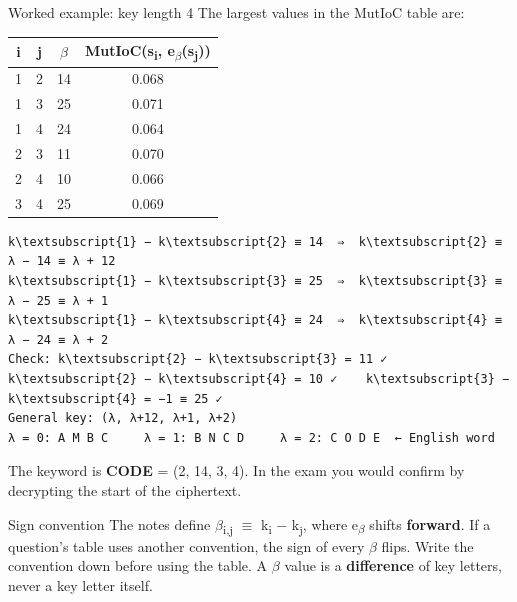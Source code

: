 \documentclass[11pt,a4paper]{article}
\begin{document}
\begin{example}{Worked example: key length 4}
The largest values in the MutIoC table are:\par
\begin{center}\begin{tabular}{|c|c|c|c|}\hline
\rowcolor{navy!10}\textbf{i} & \textbf{j} & \textbf{\ensuremath{\beta}} & \textbf{MutIoC(s\textsubscript{i}, e\textsubscript{\ensuremath{\beta}}(s\textsubscript{j}))} \\ \hline
1 & 2 & 14 & 0.068 \\ \hline
1 & 3 & 25 & 0.071 \\ \hline
1 & 4 & 24 & 0.064 \\ \hline
2 & 3 & 11 & 0.070 \\ \hline
2 & 4 & 10 & 0.066 \\ \hline
3 & 4 & 25 & 0.069 \\ \hline
\end{tabular}\end{center}
\begin{workbox}
\begin{Verbatim}[commandchars=\\\{\},fontsize=\footnotesize]
k\textsubscript{1} − k\textsubscript{2} ≡ 14  ⇒  k\textsubscript{2} ≡ λ − 14 ≡ λ + 12
k\textsubscript{1} − k\textsubscript{3} ≡ 25  ⇒  k\textsubscript{3} ≡ λ − 25 ≡ λ + 1
k\textsubscript{1} − k\textsubscript{4} ≡ 24  ⇒  k\textsubscript{4} ≡ λ − 24 ≡ λ + 2
Check: k\textsubscript{2} − k\textsubscript{3} = 11 ✓    k\textsubscript{2} − k\textsubscript{4} = 10 ✓    k\textsubscript{3} − k\textsubscript{4} = −1 ≡ 25 ✓
General key: (λ, λ+12, λ+1, λ+2)
λ = 0: A M B C     λ = 1: B N C D     λ = 2: C O D E  ← English word
\end{Verbatim}
\end{workbox}
The keyword is \textbf{CODE} = (2, 14, 3, 4). In the exam you would confirm by decrypting the start of the ciphertext.\par
\end{example}
\begin{trap}{Sign convention}
The notes define \ensuremath{\beta}\textsubscript{i,j} \ensuremath{\equiv} k\textsubscript{i} \ensuremath{-} k\textsubscript{j}, where e\textsubscript{\ensuremath{\beta}} shifts \textbf{forward}. If a question's table uses another convention, the sign of every \ensuremath{\beta} flips. Write the convention down before using the table. A \ensuremath{\beta} value is a \textbf{difference} of key letters, never a key letter itself.\par
\end{trap}
\end{document}
